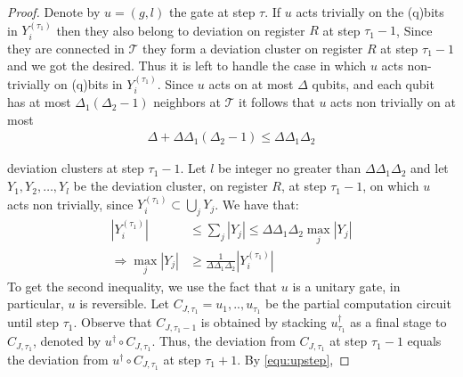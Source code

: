 \begin{proof}
  Denote by $u=(g,l)$ the gate at step $\tau$. If $u$ acts trivially on the (q)bits in $Y_{i}^{(\tau_{1})}$ then they also belong to deviation on register $R$ at step $\tau_{1}-1$, Since they are connected in $\mathcal{T}$ they form a deviation cluster on register $R$ at step $\tau_{1}-1$ and we got the desired. Thus it is left to handle the case in which $u$ acts non-trivially on (q)bits in $Y_{i}^{(\tau_{1})}$.
  Since $u$ acts on at most $\Delta$ qubits, and each qubit has at most $\Delta_{1}(\Delta_{2} -1)$ neighbors at $\mathcal{T}$ it follows that $u$ acts non trivially on at most
  \begin{equation*}
    \begin{split}
      \Delta + \Delta\Delta_{1}\left( \Delta_{2} - 1 \right) \le \Delta\Delta_{1}\Delta_{2}
    \end{split}
  \end{equation*}

  deviation clusters at step $\tau_{1} -1$. Let $l$ be integer no greater than $\Delta\Delta_{1}\Delta_{2}$ and let $Y_{1}, Y_{2}, \ldots, Y_{l}$ be the deviation cluster, on register $R$, at step $\tau_{1} - 1$, on which $u$ acts non trivially, since $Y_{i}^{(\tau_{1})} \subset \bigcup_{j} Y_{j}$. We have that: 
  \begin{equation}
    \label{equ:upstep}
    \begin{split}
       |Y_{i}^{(\tau_{1})} | & \le \sum_{j} |Y_{j}| \le \Delta\Delta_{1}\Delta_{2} \max_{j} |Y_{j}| \\
       \Rightarrow \max_{j}|Y_{j}| & \ge \frac{1}{\Delta\Delta_{1}\Delta_{2}} |Y_{i}^{(\tau_{1})} |
    \end{split}
  \end{equation}
To get the second inequality, we use the fact that $u$ is a unitary gate, in particular, $u$ is reversible. Let $C_{J,\tau_{1}} = u_{1},..,u_{\tau_{1}}$ be the partial computation circuit until step $\tau_{1}$. Observe that $C_{J,\tau_{1}-1}$ is obtained by stacking $u_{\tau_{1}}^{\dagger}$ as a final stage to $C_{J,\tau_{1}}$, denoted by $u^{\dagger} \circ C_{J,\tau_{1}}$. Thus, the deviation from $C_{J,\tau_{1}}$ at step $\tau_{1} -1$ equals the deviation from $u^{\dagger} \circ C_{J,\tau_{1}}$ at step $\tau_{1}+1$. By \cref{equ:upstep},
\end{proof}

